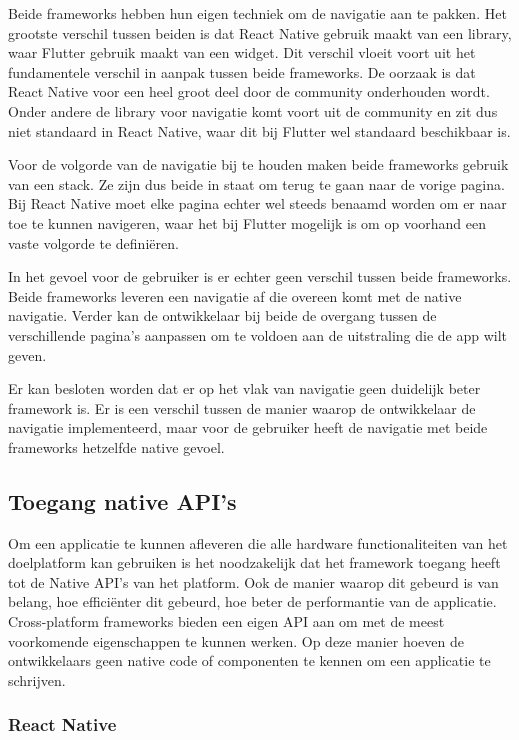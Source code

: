 Beide frameworks hebben hun eigen techniek om de navigatie aan te pakken. Het
grootste verschil tussen beiden is dat React Native gebruik maakt van een
library, waar Flutter gebruik maakt van een widget. Dit verschil vloeit voort
uit het fundamentele verschil in aanpak tussen beide frameworks. De oorzaak is
dat React Native voor een heel groot deel door de community onderhouden wordt.
Onder andere de library voor navigatie komt voort uit de community en zit dus
niet standaard in React Native, waar dit bij Flutter wel standaard beschikbaar
is.

Voor de volgorde van de navigatie bij te houden maken beide frameworks gebruik
van een stack. Ze zijn dus beide in staat om terug te gaan naar de vorige
pagina. Bij React Native moet elke pagina echter wel steeds benaamd worden om er
naar toe te kunnen navigeren, waar het bij Flutter mogelijk is om op voorhand
een vaste volgorde te definiëren.

In het gevoel voor de gebruiker is er echter geen verschil tussen beide
frameworks. Beide frameworks leveren een navigatie af die overeen komt met de
native navigatie. Verder kan de ontwikkelaar bij beide de overgang tussen de
verschillende pagina's aanpassen om te voldoen aan de uitstraling die de app
wilt geven. 

Er kan besloten worden dat er op het vlak van navigatie geen duidelijk beter
framework is. Er is een verschil tussen de manier waarop de ontwikkelaar de
navigatie implementeerd, maar voor de gebruiker heeft de navigatie met beide
frameworks hetzelfde native gevoel.

\subsection{Toegang native API's}
\label{subsec:toegangNativeAPIs}

Om een applicatie te kunnen afleveren die alle hardware functionaliteiten van
het doelplatform kan gebruiken is het noodzakelijk dat het framework toegang
heeft tot de Native API's van het platform. Ook de manier waarop dit gebeurd is
van belang, hoe efficiënter dit gebeurd, hoe beter de performantie van de
applicatie. Cross-platform frameworks bieden een eigen API aan om met de meest
voorkomende eigenschappen te kunnen werken. Op deze manier hoeven de
ontwikkelaars geen native code of componenten te kennen om een applicatie te
schrijven.

\subsubsection{React Native}
\label{subsubsec:nativeAPIReactNative}

